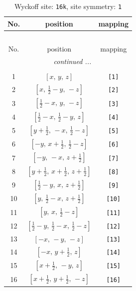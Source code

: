 \documentclass[fleqn,8pt]{jsarticle}
\begin{document}
\begin{longtable}{ccc}
\caption{Wyckoff site: {\tt 16k}, site symmetry: {\tt 1}}
 \\
 \hline \hline
No. & position & mapping \\ \hline \endfirsthead

\multicolumn{2}{l}{\tablename\ \thetable{}} \\
 \hline \hline
No. & position & mapping \\ \hline \endhead

 \hline \hline
\multicolumn{2}{r}{\footnotesize\it continued ...} \\ \endfoot

 \hline \hline
\multicolumn{2}{r}{} \\ \endlastfoot

1 & $\left[ x,\, y,\, z \right]$ & {\tt [1]} \\ \hline
2 & $\left[ x,\, \frac{1}{2} - y,\, - z \right]$ & {\tt [2]} \\ \hline
3 & $\left[ \frac{1}{2} - x,\, y,\, - z \right]$ & {\tt [3]} \\ \hline
4 & $\left[ \frac{1}{2} - x,\, \frac{1}{2} - y,\, z \right]$ & {\tt [4]} \\ \hline
5 & $\left[ y + \frac{1}{2},\, - x,\, \frac{1}{2} - z \right]$ & {\tt [5]} \\ \hline
6 & $\left[ - y,\, x + \frac{1}{2},\, \frac{1}{2} - z \right]$ & {\tt [6]} \\ \hline
7 & $\left[ - y,\, - x,\, z + \frac{1}{2} \right]$ & {\tt [7]} \\ \hline
8 & $\left[ y + \frac{1}{2},\, x + \frac{1}{2},\, z + \frac{1}{2} \right]$ & {\tt [8]} \\ \hline
9 & $\left[ \frac{1}{2} - y,\, x,\, z + \frac{1}{2} \right]$ & {\tt [9]} \\ \hline
10 & $\left[ y,\, \frac{1}{2} - x,\, z + \frac{1}{2} \right]$ & {\tt [10]} \\ \hline
11 & $\left[ y,\, x,\, \frac{1}{2} - z \right]$ & {\tt [11]} \\ \hline
12 & $\left[ \frac{1}{2} - y,\, \frac{1}{2} - x,\, \frac{1}{2} - z \right]$ & {\tt [12]} \\ \hline
13 & $\left[ - x,\, - y,\, - z \right]$ & {\tt [13]} \\ \hline
14 & $\left[ - x,\, y + \frac{1}{2},\, z \right]$ & {\tt [14]} \\ \hline
15 & $\left[ x + \frac{1}{2},\, - y,\, z \right]$ & {\tt [15]} \\ \hline
16 & $\left[ x + \frac{1}{2},\, y + \frac{1}{2},\, - z \right]$ & {\tt [16]} \\
\end{longtable}
\end{document}
